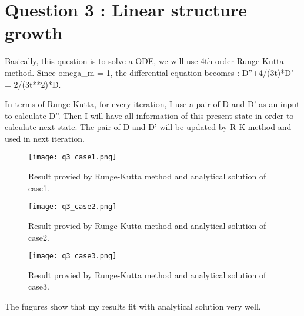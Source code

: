 \section{Question 3 : Linear structure growth}
Basically, this question is to solve a ODE, we will use 4th order Runge-Kutta method.
Since omega_m = 1, the differential equation becomes :
D''+4/(3t)*D' = 2/(3t**2)*D.

In terms of Runge-Kutta, for every iteration, I use a pair of D and D' as an input to calculate D''. Then I will have all information of this present state in order to calculate next state. The pair of D and D' will be updated by R-K method and used
in next iteration.



\begin{figure}
  \centering
  \texttt{[image: q3\_case1.png]}
  \caption{Result provied by Runge-Kutta method and analytical solution of case1.}
  \label{fig:q3_case1}
\end{figure}

\begin{figure}
  \centering
  \texttt{[image: q3\_case2.png]}
  \caption{Result provied by Runge-Kutta method and analytical solution of case2.}
  \label{fig:q3_case1}
\end{figure}

\begin{figure}
  \centering
  \texttt{[image: q3\_case3.png]}
  \caption{Result provied by Runge-Kutta method and analytical solution of case3.}
  \label{fig:q3_case1}
\end{figure}

The fugures show that my results fit with analytical solution very well.